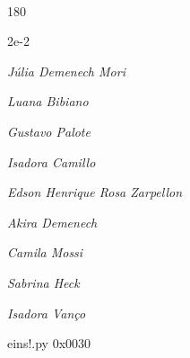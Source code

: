 \documentclass[12pt]{article}
\begin{document}
	\hfill	  	  


\pagebreak			

	\ 
	\vfill
	\begin{turn}{180}	
		\begin{minipage}{\textwidth}
		  	\ttfamily %
			\centering
			{\Huge 2e-2}
		  
			\hfill
		  
			

\textit{\small Júlia Demenech Mori}

\textit{\small Luana Bibiano}

\textit{\small Gustavo Palote}

\textit{\small Isadora Camillo}

\textit{\small Edson Henrique Rosa Zarpellon}

\textit{\small Akira Demenech}

\textit{\small Camila Mossi}

\textit{\small Sabrina Heck}

\textit{\small Isadora Vanço}

\bigskip

eins!.py
0x0030


		\end{minipage}	
	\end{turn}
	\vfill
	\

\pagebreak
\end{document}
